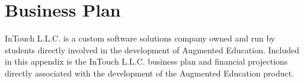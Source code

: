 
\chapter{Business Plan}

InTouch L.L.C. is a custom software solutions company owned and run by students directly involved in the development of Augmented Education. Included in this appendix is the InTouch L.L.C. business plan and financial projections directly associated with the development of the Augmented Education product.  

